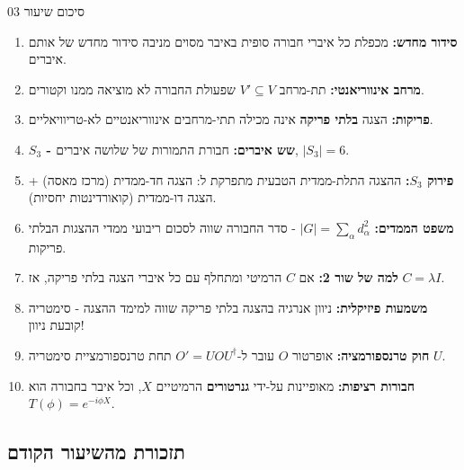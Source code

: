 \begin{summarybox}[label=box:lecture3_summary]{סיכום שיעור 03}
\begin{enumerate}
    \item \textbf{סידור מחדש:} מכפלת כל איברי חבורה סופית באיבר מסוים מניבה סידור מחדש של אותם איברים.
    
    \item \textbf{מרחב אינווריאנטי:} תת-מרחב $V' \subseteq V$ שפעולת החבורה לא מוציאה ממנו וקטורים.
    
    \item \textbf{פריקות:} הצגה \textbf{בלתי פריקה} אינה מכילה תתי-מרחבים אינווריאנטיים לא-טריוויאליים.
    
    \item \textbf{$S_3$ - שש איברים:} חבורת התמורות של שלושה איברים, $|S_3| = 6$.
    
    \item \textbf{פירוק $S_3$:} ההצגה התלת-ממדית הטבעית מתפרקת ל: הצגה חד-ממדית (מרכז מאסה) + הצגה דו-ממדית (קואורדינטות יחסיות).
    
    \item \textbf{משפט הממדים:} $|G| = \sum_\alpha d_\alpha^2$ - סדר החבורה שווה לסכום ריבועי ממדי ההצגות הבלתי פריקות.
    
    \item \textbf{למה של שור 2:} אם $C$ הרמיטי ומתחלף עם כל איברי הצגה בלתי פריקה, אז $C = \lambda I$.
    
    \item \textbf{משמעות פיזיקלית:} ניוון אנרגיה בהצגה בלתי פריקה שווה למימד ההצגה - סימטריה קובעת ניוון!
    
    \item \textbf{חוק טרנספורמציה:} אופרטור $O$ עובר ל-$O' = UOU^\dagger$ תחת טרנספורמציית סימטריה $U$.
    
    \item \textbf{חבורות רציפות:} מאופיינות על-ידי \textbf{גנרטורים} הרמיטיים $X$, וכל איבר בחבורה הוא $T(\phi) = e^{-i\phi X}$.
\end{enumerate}
\end{summarybox}
\newpage
\subsection*{תזכורת מהשיעור הקודם}

